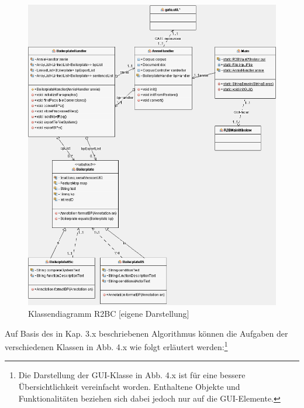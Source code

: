 \documentclass[12pt]{report}
\begin{document}
\begin{figure}[h!]
\begin{center}
\includegraphics[scale=0.6]{Bilder/r2bc-klassen.png}
\caption{Klassendiagramm R2BC [eigene Darstellung]}
\end{center}
\end{figure}

Auf Basis des in Kap. 3.x beschriebenen Algorithmus können die Aufgaben der verschiedenen Klassen in Abb. 4.x wie folgt erläutert werden:\footnote{Die Darstellung der GUI-Klasse in Abb. 4.x ist für eine bessere Übersichtlichkeit vereinfacht worden. Enthaltene Objekte und Funktionalitäten beziehen sich dabei jedoch nur auf die GUI-Elemente.}
\end{document}
